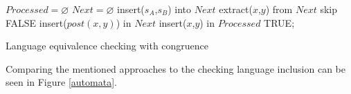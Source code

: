 	\begin{algorithm}[h]
		\label{algCongr}
			$Processed = \varnothing$\;
			$Next = \varnothing$\;
			insert($s_A$,$s_B$) into $Next$\;
			{
				extract($x$,$y$) from $Next$\;
				{skip\;}
				{
					\Return FALSE\;
				}
					insert($post(x,y)$) in $Next$\;
				insert($x$,$y$) in $Processed$\;
			}
			\Return TRUE;
		\caption{Language equivalence checking with congruence}
\end{algorithm}

Comparing the mentioned approaches to the checking language inclusion can be seen in Figure \ref{automata}.
